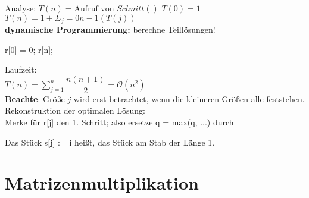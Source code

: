 Analyse:
$T(n) = \text{Aufruf von } Schnitt()$
$T(0) = 1$
$T(n) = 1 + \Sigma_j = 0n-1(T(j))$
\\
\textbf{dynamische Programmierung:} berechne Teillösungen!\\
\begin{algorithmic}
\State r[0] = 0;
\EndFor
 \Return r[n];
\EndFunction
\end{algorithmic}
Laufzeit:\\
$T(n) = \sum\nolimits_{j = 1}^n \dfrac{n(n+1)}{2} = \mathcal O(n^2)$\\
\textbf{Beachte}: Größe $j$ wird erst betrachtet, wenn die kleineren Größen alle feststehen.\\
Rekonstruktion der optimalen Lösung:\\

Merke für r[j] den 1. Schritt; also ersetze q = max(q, ...) durch\\ 
\begin{algorithmic}
\EndIf
\end{algorithmic}

Das Stück s[j] := i heißt, das Stück am Stab der Länge 1.\\

\section{Matrizenmultiplikation}

